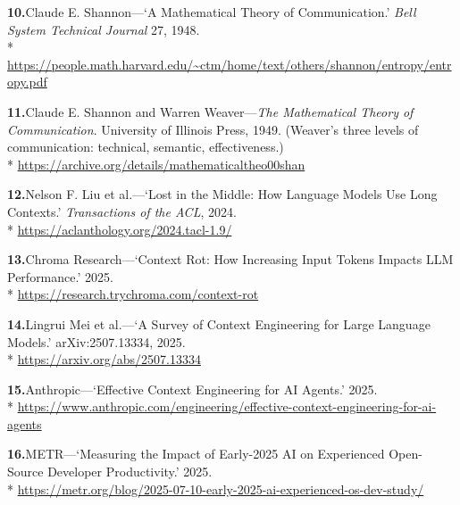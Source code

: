 \documentclass[11pt, a4paper]{article}
\begin{document}
\noindent\textbf{10.}\enspace Claude E. Shannon---`A Mathematical Theory of
Communication.' \textit{Bell System Technical Journal} 27, 1948.\\*
{\fontsize{8}{10}\selectfont\color{midb}
\href{https://people.math.harvard.edu/~ctm/home/text/others/shannon/entropy/entropy.pdf}{https://people.math.harvard.edu/\textasciitilde ctm/home/text/others/shannon/entropy/entropy.pdf}}


\noindent\textbf{11.}\enspace Claude E. Shannon and Warren Weaver---\textit{The
Mathematical Theory of Communication}. University of Illinois Press, 1949. (Weaver's
three levels of communication: technical, semantic, effectiveness.)\\*
{\fontsize{8}{10}\selectfont\color{midb}
\href{https://archive.org/details/mathematicaltheo00shan}{https://archive.org/details/mathematicaltheo00shan}}


\noindent\textbf{12.}\enspace Nelson F. Liu et al.---`Lost in the Middle: How Language
Models Use Long Contexts.' \textit{Transactions of the ACL}, 2024.\\*
{\fontsize{8}{10}\selectfont\color{midb}
\href{https://aclanthology.org/2024.tacl-1.9/}{https://aclanthology.org/2024.tacl-1.9/}}


\noindent\textbf{13.}\enspace Chroma Research---`Context Rot: How Increasing Input
Tokens Impacts LLM Performance.' 2025.\\*
{\fontsize{8}{10}\selectfont\color{midb}
\href{https://research.trychroma.com/context-rot}{https://research.trychroma.com/context-rot}}


\noindent\textbf{14.}\enspace Lingrui Mei et al.---`A Survey of Context Engineering for
Large Language Models.' arXiv:2507.13334, 2025.\\*
{\fontsize{8}{10}\selectfont\color{midb}
\href{https://arxiv.org/abs/2507.13334}{https://arxiv.org/abs/2507.13334}}


\noindent\textbf{15.}\enspace Anthropic---`Effective Context Engineering for AI
Agents.' 2025.\\*
{\fontsize{8}{10}\selectfont\color{midb}
\href{https://www.anthropic.com/engineering/effective-context-engineering-for-ai-agents}{https://www.anthropic.com/engineering/effective-context-engineering-for-ai-agents}}


\noindent\textbf{16.}\enspace METR---`Measuring the Impact of Early-2025 AI on
Experienced Open-Source Developer Productivity.' 2025.\\*
{\fontsize{8}{10}\selectfont\color{midb}
\href{https://metr.org/blog/2025-07-10-early-2025-ai-experienced-os-dev-study/}{https://metr.org/blog/2025-07-10-early-2025-ai-experienced-os-dev-study/}}
\end{document}
